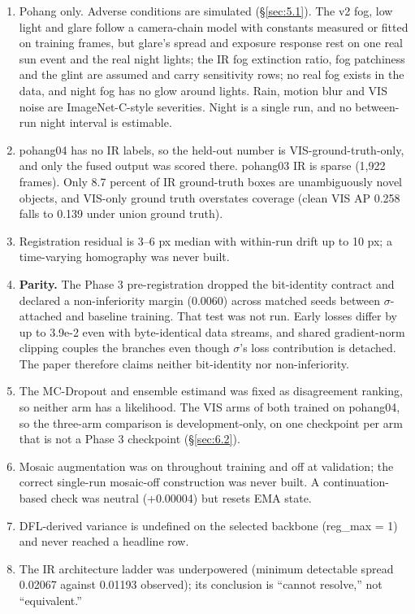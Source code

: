 \documentclass[10pt]{article}
\begin{document}
\begin{enumerate}
\item Pohang only. Adverse conditions are simulated (\S\ref{sec:5.1}). The v2 fog, low light and glare follow a camera-chain model with constants measured or fitted on training frames, but glare's spread and exposure response rest on one real sun event and the real night lights; the IR fog extinction ratio, fog patchiness and the glint are assumed and carry sensitivity rows; no real fog exists in the data, and night fog has no glow around lights. Rain, motion blur and VIS noise are ImageNet-C-style severities. Night is a single run, and no between-run night interval is estimable.
\item pohang04 has no IR labels, so the held-out number is VIS-ground-truth-only, and only the fused output was scored there. pohang03 IR is sparse (1,922 frames). Only 8.7 percent of IR ground-truth boxes are unambiguously novel objects, and VIS-only ground truth overstates coverage (clean VIS AP 0.258 falls to 0.139 under union ground truth).
\item Registration residual is 3--6 px median with within-run drift up to 10 px; a time-varying homography was never built.
\item \textbf{Parity.} The Phase 3 pre-registration dropped the bit-identity contract and declared a non-inferiority margin (0.0060) across matched seeds between $\sigma$-attached and baseline training. That test was not run. Early losses differ by up to 3.9e-2 even with byte-identical data streams, and shared gradient-norm clipping couples the branches even though $\sigma$'s loss contribution is detached. The paper therefore claims neither bit-identity nor non-inferiority.
\item The MC-Dropout and ensemble estimand was fixed as disagreement ranking, so neither arm has a likelihood. The VIS arms of both trained on pohang04, so the three-arm comparison is development-only, on one checkpoint per arm that is not a Phase 3 checkpoint (\S\ref{sec:6.2}).
\item Mosaic augmentation was on throughout training and off at validation; the correct single-run mosaic-off construction was never built. A continuation-based check was neutral (+0.00004) but resets EMA state.
\item DFL-derived variance is undefined on the selected backbone (reg\_max = 1) and never reached a headline row.
\item The IR architecture ladder was underpowered (minimum detectable spread 0.02067 against 0.01193 observed); its conclusion is ``cannot resolve,'' not ``equivalent.''

\end{enumerate}
\end{document}
